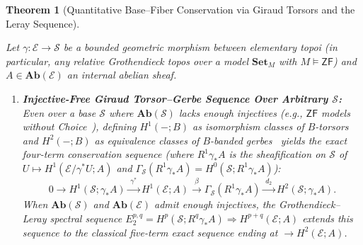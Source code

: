 \documentclass[10pt,twoside,openright]{book}
\theoremstyle{crmplain}
\newtheorem{theorem}{Theorem}[section]
\theoremstyle{crmdef}
\theoremstyle{crmremark}
\begin{document}
\begin{theorem}[Quantitative Base--Fiber Conservation via Giraud Torsors and the Leray Sequence]\label{thm:quantitative-conservation}%
%

Let $\gamma : \mathcal{E} \to \mathcal{S}$ be a bounded geometric morphism between elementary topoi (in particular, any relative Grothendieck topos over a model $\mathbf{Set}_M$ with $M \models \mathsf{ZF}$) and $A \in \mathbf{Ab}(\mathcal{E})$ an internal abelian sheaf.

\begin{enumerate}[label=\textup{(\alph*)},leftmargin=2.0em]

  \item \textbf{Injective-Free Giraud Torsor--Gerbe Sequence Over Arbitrary $\mathcal{S}$:} Even over a base $\mathcal{S}$ where $\mathbf{Ab}(\mathcal{S})$ lacks enough injectives (e.g., $\mathsf{ZF}$ models without Choice~\cite[Theorem~1.1]{Blass79}), defining $H^1(-; B)$ as isomorphism classes of $B$-torsors and $H^2(-; B)$ as equivalence classes of $B$-banded gerbes~\cite[Chs.~IV--V]{Giraud71} yields the exact four-term conservation sequence (where $R^1\gamma_* A$ is the sheafification on $\mathcal{S}$ of $U \mapsto H^1(\mathcal{E}/{\gamma^*U}; A)$ and $\Gamma_{\mathcal{S}}(R^1\gamma_* A) = H^0(\mathcal{S}; R^1\gamma_* A)$):
  \[
    0 \longrightarrow H^1(\mathcal{S}; \gamma_* A) \xrightarrow{\;\gamma^*\;} H^1(\mathcal{E}; A) \xrightarrow{\;\beta\;} \Gamma_{\mathcal{S}}(R^1\gamma_* A) \xrightarrow{\;d_2\;} H^2(\mathcal{S}; \gamma_* A).
  \]
  When $\mathbf{Ab}(\mathcal{S})$ and $\mathbf{Ab}(\mathcal{E})$ admit enough injectives, the Grothendieck--Leray spectral sequence $E_2^{p,q} = H^p(\mathcal{S}; R^q\gamma_* A) \Longrightarrow H^{p+q}(\mathcal{E}; A)$ extends this sequence to the classical five-term exact sequence ending at $\to H^2(\mathcal{E}; A)$.


\end{enumerate}
\end{theorem}
\end{document}
